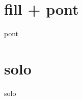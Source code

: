 \documentclass[11pt]{article}
\begin{document}
\makesongtitle

\newpage
\section*{fill + pont}
{pont}
\section*{solo}
{solo}
\newpage

\end{document}
